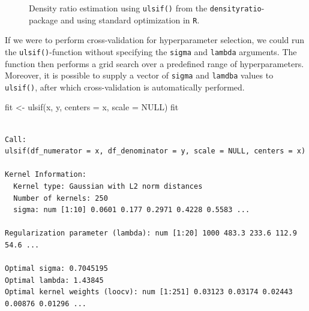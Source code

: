 \documentclass[
]{article}
\newenvironment{Shaded}{\begin{snugshade}}{\end{snugshade}}
\newcommand{\AttributeTok}[1]{\textcolor[rgb]{0.40,0.45,0.13}{#1}}
\newcommand{\ConstantTok}[1]{\textcolor[rgb]{0.56,0.35,0.01}{#1}}
\newcommand{\FunctionTok}[1]{\textcolor[rgb]{0.28,0.35,0.67}{#1}}
\newcommand{\NormalTok}[1]{\textcolor[rgb]{0.00,0.23,0.31}{#1}}
\newcommand{\OtherTok}[1]{\textcolor[rgb]{0.00,0.23,0.31}{#1}}
\begin{document}
\linespread{1}

\begin{figure}[t]


\caption{\label{fig-AppA}Density ratio estimation using \texttt{ulsif()}
from the \texttt{densityratio}-package and using standard optimization
in \texttt{R}.}

\end{figure}%

\linespread{2}

If we were to perform cross-validation for hyperparameter selection, we
could run the \texttt{ulsif()}-function without specifying the
\texttt{sigma} and \texttt{lambda} arguments. The function then performs
a grid search over a predefined range of hyperparameters. Moreover, it
is possible to supply a vector of \texttt{sigma} and \texttt{lamdba}
values to \texttt{ulsif()}, after which cross-validation is
automatically performed.

\linespread{1}

\begin{Shaded}
\begin{Highlighting}[]
\NormalTok{fit }\OtherTok{\textless{}{-}} \FunctionTok{ulsif}\NormalTok{(x, y, }\AttributeTok{centers =}\NormalTok{ x, }\AttributeTok{scale =} \ConstantTok{NULL}\NormalTok{)}
\NormalTok{fit}
\end{Highlighting}
\end{Shaded}

\begin{verbatim}

Call:
ulsif(df_numerator = x, df_denominator = y, scale = NULL, centers = x)

Kernel Information:
  Kernel type: Gaussian with L2 norm distances
  Number of kernels: 250
  sigma: num [1:10] 0.0601 0.177 0.2971 0.4228 0.5583 ...

Regularization parameter (lambda): num [1:20] 1000 483.3 233.6 112.9 54.6 ...

Optimal sigma: 0.7045195
Optimal lambda: 1.43845
Optimal kernel weights (loocv): num [1:251] 0.03123 0.03174 0.02443 0.00876 0.01296 ...
 
\end{verbatim}
\end{document}
